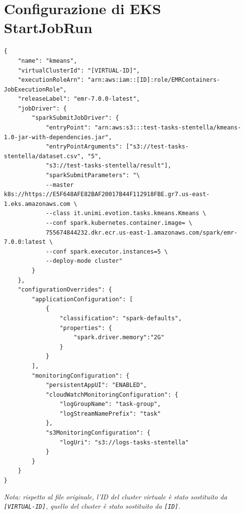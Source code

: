 \documentclass[12pt,a4paper,fleqn,titlepage]{report}
\begin{document}
\chapter{Configurazione di EKS StartJobRun}\label{apx:startjob}
\begin{lstlisting}
{
    "name": "kmeans",
    "virtualClusterId": "[VIRTUAL-ID]",
    "executionRoleArn": "arn:aws:iam::[ID]:role/EMRContainers-JobExecutionRole",
    "releaseLabel": "emr-7.0.0-latest",
    "jobDriver": {
        "sparkSubmitJobDriver": {
            "entryPoint": "arn:aws:s3:::test-tasks-stentella/kmeans-1.0-jar-with-dependencies.jar",
            "entryPointArguments": ["s3://test-tasks-stentella/dataset.csv", "5",
            "s3://test-tasks-stentella/result"],
            "sparkSubmitParameters": "\
            --master k8s://https://E5F648AFE82BAF20017B44F112918FBE.gr7.us-east-1.eks.amazonaws.com \
            --class it.unimi.evotion.tasks.kmeans.Kmeans \
            --conf spark.kubernetes.container.image= \
            755674844232.dkr.ecr.us-east-1.amazonaws.com/spark/emr-7.0.0:latest \
            --conf spark.executor.instances=5 \
            --deploy-mode cluster"
        }
    },
    "configurationOverrides": {
        "applicationConfiguration": [
            {
                "classification": "spark-defaults",
                "properties": {
                    "spark.driver.memory":"2G"
                }
            }
        ],
        "monitoringConfiguration": {
            "persistentAppUI": "ENABLED",
            "cloudWatchMonitoringConfiguration": {
                "logGroupName": "task-group",
                "logStreamNamePrefix": "task"
            },
            "s3MonitoringConfiguration": {
                "logUri": "s3://logs-tasks-stentella"
            }
        }
    }
}
\end{lstlisting}
\textit{Nota: rispetto al file originale, l'ID del cluster virtuale è stato sostituito da \emph{\lstinline{[VIRTUAL-ID]}}, quello del cluster è stato sostituito da \emph{\lstinline{[ID]}}.}
\end{document}
